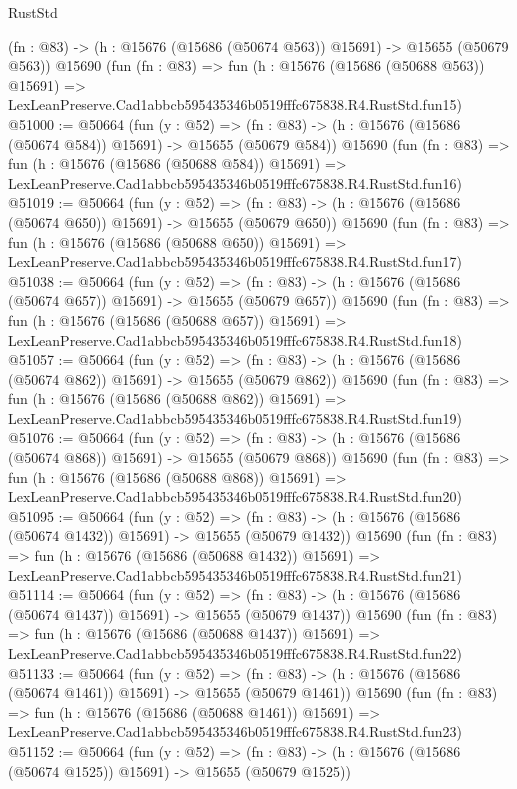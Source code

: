 \begin{lexlean}{RustStd}
\begin{coremodule}
    (fn : @83) -> (h : @15676 (@15686 (@50674 @563)) @15691) -> @15655 (@50679 @563))
    @15690
    (fun (fn : @83) =>
    fun (h : @15676 (@15686 (@50688 @563)) @15691) =>
    LexLeanPreserve.Cad1abbcb595435346b0519fffc675838.R4.RustStd.fun15)
@51000 := @50664
    (fun (y : @52) =>
    (fn : @83) -> (h : @15676 (@15686 (@50674 @584)) @15691) -> @15655 (@50679 @584))
    @15690
    (fun (fn : @83) =>
    fun (h : @15676 (@15686 (@50688 @584)) @15691) =>
    LexLeanPreserve.Cad1abbcb595435346b0519fffc675838.R4.RustStd.fun16)
@51019 := @50664
    (fun (y : @52) =>
    (fn : @83) -> (h : @15676 (@15686 (@50674 @650)) @15691) -> @15655 (@50679 @650))
    @15690
    (fun (fn : @83) =>
    fun (h : @15676 (@15686 (@50688 @650)) @15691) =>
    LexLeanPreserve.Cad1abbcb595435346b0519fffc675838.R4.RustStd.fun17)
@51038 := @50664
    (fun (y : @52) =>
    (fn : @83) -> (h : @15676 (@15686 (@50674 @657)) @15691) -> @15655 (@50679 @657))
    @15690
    (fun (fn : @83) =>
    fun (h : @15676 (@15686 (@50688 @657)) @15691) =>
    LexLeanPreserve.Cad1abbcb595435346b0519fffc675838.R4.RustStd.fun18)
@51057 := @50664
    (fun (y : @52) =>
    (fn : @83) -> (h : @15676 (@15686 (@50674 @862)) @15691) -> @15655 (@50679 @862))
    @15690
    (fun (fn : @83) =>
    fun (h : @15676 (@15686 (@50688 @862)) @15691) =>
    LexLeanPreserve.Cad1abbcb595435346b0519fffc675838.R4.RustStd.fun19)
@51076 := @50664
    (fun (y : @52) =>
    (fn : @83) -> (h : @15676 (@15686 (@50674 @868)) @15691) -> @15655 (@50679 @868))
    @15690
    (fun (fn : @83) =>
    fun (h : @15676 (@15686 (@50688 @868)) @15691) =>
    LexLeanPreserve.Cad1abbcb595435346b0519fffc675838.R4.RustStd.fun20)
@51095 := @50664
    (fun (y : @52) =>
    (fn : @83) -> (h : @15676 (@15686 (@50674 @1432)) @15691) -> @15655 (@50679 @1432))
    @15690
    (fun (fn : @83) =>
    fun (h : @15676 (@15686 (@50688 @1432)) @15691) =>
    LexLeanPreserve.Cad1abbcb595435346b0519fffc675838.R4.RustStd.fun21)
@51114 := @50664
    (fun (y : @52) =>
    (fn : @83) -> (h : @15676 (@15686 (@50674 @1437)) @15691) -> @15655 (@50679 @1437))
    @15690
    (fun (fn : @83) =>
    fun (h : @15676 (@15686 (@50688 @1437)) @15691) =>
    LexLeanPreserve.Cad1abbcb595435346b0519fffc675838.R4.RustStd.fun22)
@51133 := @50664
    (fun (y : @52) =>
    (fn : @83) -> (h : @15676 (@15686 (@50674 @1461)) @15691) -> @15655 (@50679 @1461))
    @15690
    (fun (fn : @83) =>
    fun (h : @15676 (@15686 (@50688 @1461)) @15691) =>
    LexLeanPreserve.Cad1abbcb595435346b0519fffc675838.R4.RustStd.fun23)
@51152 := @50664
    (fun (y : @52) =>
    (fn : @83) -> (h : @15676 (@15686 (@50674 @1525)) @15691) -> @15655 (@50679 @1525))

\end{coremodule}
\end{lexlean}
